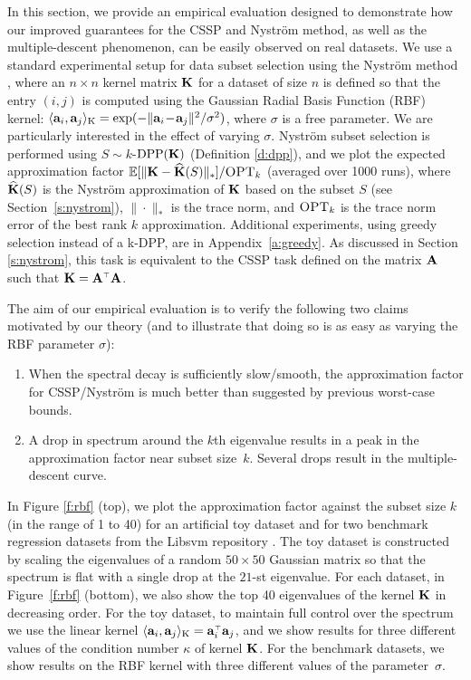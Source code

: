 \documentclass{article}
\begin{document}
In this section, we provide an empirical evaluation designed to demonstrate how our improved guarantees for the CSSP and Nystr\"om method, as well as the multiple-descent phenomenon, can be easily observed on real datasets. 
We use a standard experimental setup for data subset selection using
the Nystr\"om method \citep{revisiting-nystrom}, where an $n\times n$
kernel matrix $\mathbf K$ for a dataset of size $n$ is defined so that the
entry $(i,j)$ is computed using the Gaussian Radial Basis Function  (RBF)
kernel:
$\langle\mathbf a_i,\mathbf a_j\rangle_\text{K}=\exp(-\|\mathbf a_i\!-\!\mathbf a_j\|^2/\sigma^2)$,
where $\sigma$ is a free parameter. 
We are particularly interested in the effect of varying $\sigma$.
Nystr\"om subset selection is performed using $S\sim k$-${\mathrm{DPP}}(\mathbf K)$
(Definition \ref{d:dpp}), and we plot the expected approximation
factor $\mathbb E[\|\mathbf K-{\widehat{\mathbf K}}(S)\|_*]/{\textsc{OPT}_k}$ (averaged over 1000 runs), where
${\widehat{\mathbf K}}(S)$ is the Nystr\"om approximation of $\mathbf K$ based on the subset
$S$ (see Section~\ref{s:nystrom}), $\|\cdot\|_*$ is the trace norm,
and ${\textsc{OPT}_k}$ is the trace norm error of the best rank $k$
approximation. Additional experiments, using greedy selection instead 
of a k-DPP, are in Appendix~\ref{a:greedy}.
As discussed in Section \ref{s:nystrom}, this task is
equivalent to the CSSP task defined on the matrix $\mathbf A$ such that
$\K=\A^\top\A$. 

The aim of our empirical evaluation is to verify the following two claims motivated by our theory (and to illustrate that doing so is as easy as varying the RBF parameter $\sigma$):
\ifisarxiv\else\vspace{-3mm}\fi
\begin{enumerate}
  \item When the spectral decay is sufficiently slow/smooth, the
    approximation factor for CSSP/Nystr\"om is much better than
    suggested by previous worst-case bounds.
    \vspace{-1mm}
  \item  A drop in spectrum around the $k$th eigenvalue results in
    a peak in the approximation factor near
    subset size~$k$. Several drops result in the
    multiple-descent curve.
  \end{enumerate}
\ifisarxiv\else  \vspace{-3mm}\fi
In Figure \ref{f:rbf} (top), we plot the approximation factor against
the subset size $k$ (in the range of 1 to 40) for an artificial toy
dataset and %
for two benchmark regression datasets from the Libsvm repository
\citep[\emph{bodyfat} and \emph{eunite2001}, see][]{libsvm}. 
The toy dataset is constructed by scaling the eigenvalues of a random
$50\times 50$ Gaussian matrix so that the spectrum is flat with a
single drop at the $21$-st eigenvalue. 
For each dataset, in Figure~\ref{f:rbf} (bottom), we also show the top
40 eigenvalues of the kernel $\mathbf K$ in decreasing order. 
For the toy dataset, to maintain full control over the spectrum we use
the linear kernel $\langle\a_i,\a_j\rangle_\text{K}=\a_i^\top\a_j$, and we show results
for three different values of the condition number $\kappa$ of kernel
$\mathbf K$.  
For the benchmark datasets, we show results on the RBF kernel with 
three different values of the parameter~$\sigma$.  
\end{document}

